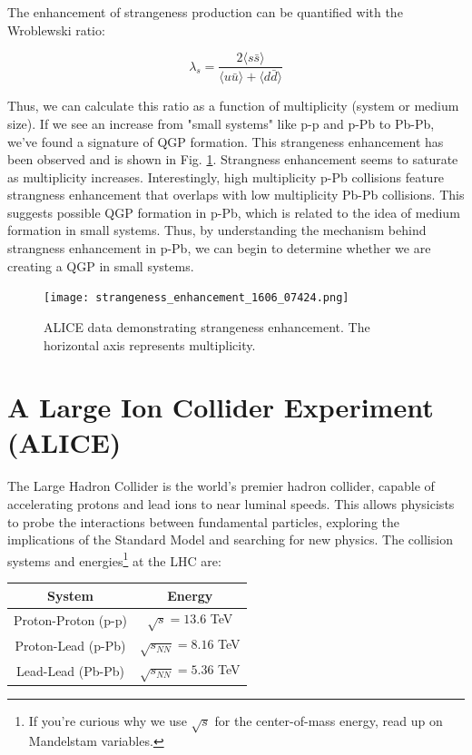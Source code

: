 \documentclass[../main.tex]{subfiles}
\begin{document}
The enhancement of strangeness production can be quantified with the Wroblewski ratio:

\begin{equation}
    \lambda_s = \frac{2 \langle s\bar{s} \rangle}{\langle u\bar{u}\rangle + \langle d\bar{d}\rangle}
\end{equation}

Thus, we can calculate this ratio as a function of multiplicity (system or medium size). If we see an increase from "small systems" like p-p and p-Pb to Pb-Pb, we've found a signature of QGP formation. This strangeness enhancement has been observed and is shown in Fig. \ref{fig: s_enhacement}. Strangness enhancement seems to saturate as multiplicity increases. Interestingly, high multiplicity p-Pb collisions feature strangness enhancement that overlaps with low multiplicity Pb-Pb collisions. This suggests possible QGP formation in p-Pb, which is related to the idea of medium formation in small systems. Thus, by understanding the mechanism behind strangness enhancement in p-Pb, we can begin to determine whether we are creating a QGP in small systems. 


\begin{figure}[h]
    \centering
    \texttt{[image: strangeness\_enhancement\_1606\_07424.png]}    
    \caption{ALICE data demonstrating strangeness enhancement. The horizontal axis represents multiplicity.}
    \label{fig: s_enhacement}
\end{figure}

\clearpage
\section{A Large Ion Collider Experiment (ALICE)}
The Large Hadron Collider is the world's premier hadron collider, capable of accelerating protons and lead ions to near luminal speeds. This allows physicists to probe the interactions between fundamental particles, exploring the implications of the Standard Model and searching for new physics. The collision systems and energies\footnote{If you're curious why we use $\sqrt{s}$ for the center-of-mass energy, read up on Mandelstam variables.} at the LHC are: 

\begin{center}
    \begin{tabular}{|c|c|} 
        \hline
        System & Energy \\
        \hline
        Proton-Proton (p-p) & $\sqrt{s} = 13.6$ TeV \\ 
        Proton-Lead (p-Pb) & $\sqrt{s_{NN}} = 8.16$ TeV \\
        Lead-Lead (Pb-Pb) & $\sqrt{s_{NN}} = 5.36$ TeV \\
        \hline
    \end{tabular}
\end{center}
\end{document}
